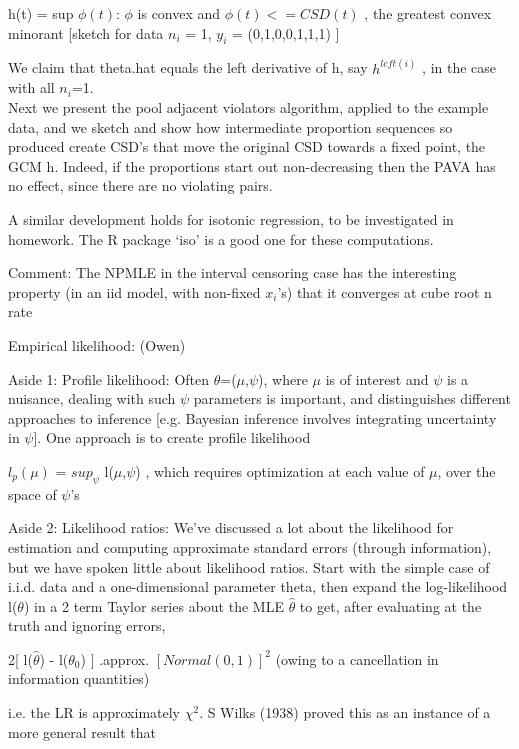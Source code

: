 \documentclass[11pt,a4paper]{article}
\begin{document}
	h(t) = sup{ $\phi(t)$:   $\phi$ is convex and $\phi(t) <= CSD(t)$ },   the greatest convex minorant  [sketch for data $n_i$ = 1, $y_i$ = (0,1,0,0,1,1,1) ]
	
	We claim that theta.hat equals the left derivative of h, say $h^{left(i)}$  , in the case with all $n_i$=1.\\
	
	Next we present the pool adjacent violators algorithm, applied to the example data, and we sketch and show how intermediate proportion sequences so produced create CSD's that move the original CSD towards a fixed point, the GCM h.   Indeed, if the proportions start out non-decreasing then the PAVA has no effect, since there are no violating pairs.
	
	A similar development holds for isotonic regression, to be investigated in homework.  The R package `iso'  is a good one for these computations.
	
	Comment:  The NPMLE in the interval censoring case has the interesting property (in an iid model, with non-fixed $x_i$'s) that it converges at cube root n rate
	
	Empirical likelihood: (Owen)
	
	Aside 1: Profile likelihood:  Often $\theta$=($\mu$,$\psi$), where $\mu$ is of interest and $\psi$ is a nuisance, dealing with such $\psi$ parameters is important, and distinguishes different approaches to inference [e.g. Bayesian inference involves integrating uncertainty in $\psi$].  One approach is to create profile likelihood
	
	$l_p(\mu)$ = $sup_{\psi}$  l($\mu$,$\psi$)    , which requires optimization at each value of $\mu$, over the space of $\psi$'s
	
	Aside 2: Likelihood ratios: We've discussed a lot about the likelihood for estimation and computing approximate standard errors (through information), but we have spoken little about likelihood ratios.  Start with the simple case of i.i.d. data and a one-dimensional parameter theta, then expand the log-likelihood l($\theta$) in a 2 term Taylor series about the MLE $\hat{\theta}$ to get, after evaluating at the truth and ignoring errors,
	
	 2[ l($\hat{\theta}$) - l($\theta_0$) ] .approx.   $[ Normal(0,1) ]^2$     (owing to a cancellation in information quantities)
	
	i.e. the LR is approximately $\chi^2$.   S Wilks (1938) proved this as an instance of a more general result that
	
\end{document}

